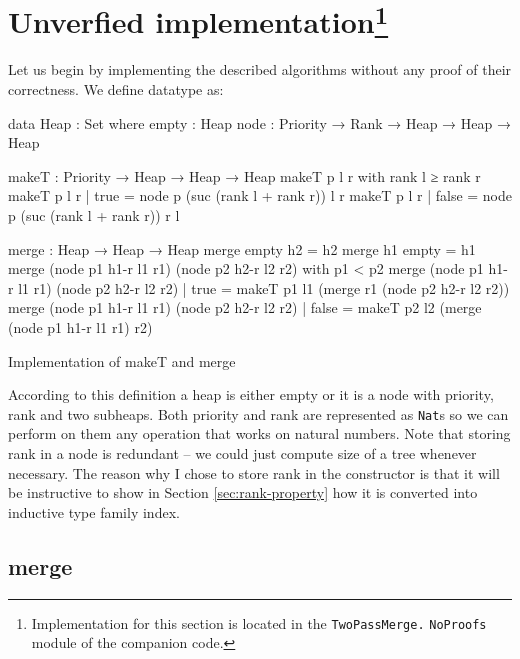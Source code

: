 \section[Unverfied implementation]{Unverfied implementation\footnote{Implementation for this section is located in the \texttt{TwoPassMerge.} \texttt{NoProofs} module of the companion code.}}


Let us begin by implementing the described algorithms without any proof of their correctness. We define \Heap datatype as:

\begin{code}
data Heap : Set where
  empty : Heap
  node  : Priority → Rank → Heap → Heap → Heap
\end{code}

\begin{listing}[b!]
\begin{code}
makeT : Priority → Heap → Heap → Heap
makeT p l r with rank l ≥ rank r
makeT p l r | true  = node p (suc (rank l + rank r)) l r
makeT p l r | false = node p (suc (rank l + rank r)) r l

merge : Heap → Heap → Heap
merge empty h2 = h2
merge h1 empty = h1
merge (node p1 h1-r l1 r1) (node p2 h2-r l2 r2)
  with p1 < p2
merge (node p1 h1-r l1 r1) (node p2 h2-r l2 r2)
  | true  = makeT p1 l1 (merge r1 (node p2 h2-r l2 r2))
merge (node p1 h1-r l1 r1) (node p2 h2-r l2 r2)
  | false = makeT p2 l2 (merge (node p1 h1-r l1 r1) r2)
\end{code}
\caption{Implementation of makeT and merge}\label{lst:makeT-merge}
\end{listing}

According to this definition a heap is either empty or it is a node with priority, rank and two subheaps. Both priority and rank are represented as \texttt{Nat}s so we can perform on them any operation that works on natural numbers. Note that storing rank in a node is redundant -- we could just compute size of a tree whenever necessary. The reason why I chose to store rank in the constructor is that it will be instructive to show in Section \ref{sec:rank-property} how it is converted into inductive type family index.

\subsection{merge}\label{sec:twopass-merge}

